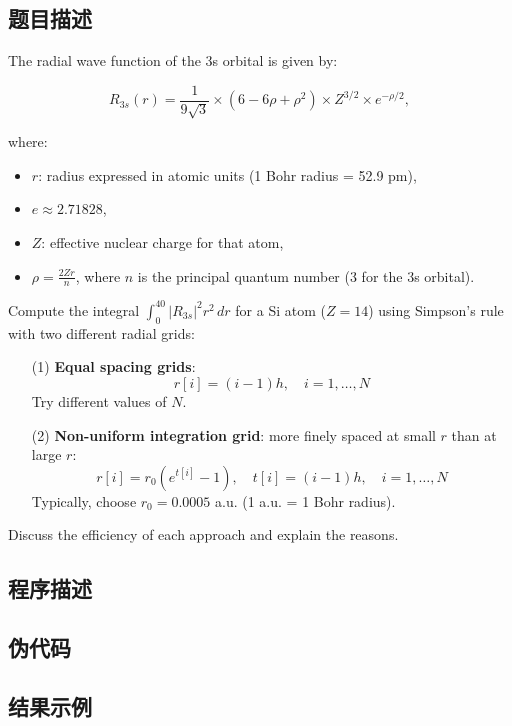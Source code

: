 \subsection{题目描述}
\noindent The radial wave function of the 3s orbital is given by:

\[
R_{3s}(r) = \frac{1}{9\sqrt{3}} \times \left( 6 - 6 \rho + \rho^2 \right) \times Z^{3/2} \times e^{-\rho/2},
\]

where:
\begin{itemize}
    \item \( r \): radius expressed in atomic units (1 Bohr radius = 52.9 pm),
    \item \( e \approx 2.71828 \),
    \item \( Z \): effective nuclear charge for that atom,
    \item \( \rho = \frac{2 Z r}{n} \), where \( n \) is the principal quantum number (3 for the 3s orbital).
\end{itemize}

Compute the integral \( \int_0^{40} \left| R_{3s} \right|^2 r^2 \, dr \) for a Si atom (\( Z = 14 \)) using Simpson's rule with two different radial grids:

\begin{enumerate}
    \item[(1)] \textbf{Equal spacing grids}: 
    \[
    r[i] = (i - 1) h, \quad i = 1, \dots, N
    \]
    Try different values of \( N \).
    
    \item[(2)] \textbf{Non-uniform integration grid}: more finely spaced at small \( r \) than at large \( r \):
    \[
    r[i] = r_0(e^{t[i]} - 1), \quad t[i] = (i - 1) h, \quad i = 1, \dots, N
    \]
    Typically, choose \( r_0 = 0.0005 \) a.u. (1 a.u. = 1 Bohr radius).
\end{enumerate}

Discuss the efficiency of each approach and explain the reasons.


\subsection{程序描述}


\subsection{伪代码}



\subsection{结果示例}

